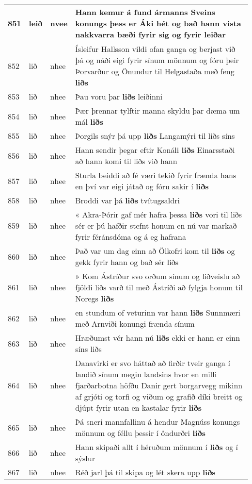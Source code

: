 \documentclass{article}
\begin{document}
\begin{longtable}{p{1cm}|p{1cm}|p{1cm}|p{13cm}}
\hline
851&leið&nvee&Hann kemur á fund ármanns Sveins konungs þess er Áki hét og bað hann vista nakkvarra bæði fyrir sig og fyrir \textbf{leiðar} \\
\hline
852&lið&nhee&Ísleifur Hallsson vildi ofan ganga og berjast við þá og náði eigi fyrir sínum mönnum og fóru þeir Þorvarður og Önundur til Helgastaða með feng \textbf{liðs} \\
\hline
853&lið&nhee&Þau voru þar \textbf{liðs} leiðinni\\
\hline
854&lið&nhee&Þær þrennar tylftir manna skyldu þar dæma um mál \textbf{liðs} \\
\hline
855&lið&nhee&Þorgils snýr þá upp \textbf{liðs} Langamýri til liðs síns\\
\hline
856&lið&nhee&Hann sendir þegar eftir Konáli \textbf{liðs} Einarsstaði að hann komi til liðs við hann\\
\hline
857&lið&nhee&Sturla beiddi að fé væri tekið fyrir frænda hans en því var eigi játað og fóru sakir í \textbf{liðs} \\
\hline
858&lið&nhee&Broddi var þá \textbf{liðs} tvítugsaldri\\
\hline
859&lið&nhee&« Akra-Þórir gaf mér hafra þessa \textbf{liðs} vori til liðs sér er þú hafðir stefnt honum en nú var markað fyrir féránsdóma og á eg hafrana\\
\hline
860&lið&nhee&Það var um dag einn að Ölkofri kom til \textbf{liðs} og gekk fyrir hann og bað sér liðs\\
\hline
861&lið&nhee&» Kom Ástríður svo orðum sínum og liðveislu að fjöldi liðs varð til með Ástríði að fylgja honum til Noregs \textbf{liðs} \\
\hline
862&lið&nhee&en stundum of veturinn var hann \textbf{liðs} Sunnmæri með Arnviði konungi frænda sínum\\
\hline
863&lið&nhee&Hræðumst vér hann nú \textbf{liðs} ekki er hann er einn síns liðs\\
\hline
864&lið&nhee&Danavirki er svo háttað að firðir tveir ganga í landið sínum megin landsins hvor en milli fjarðarbotna höfðu Danir gert borgarvegg mikinn af grjóti og torfi og viðum og grafið díki breitt og djúpt fyrir utan en kastalar fyrir \textbf{liðs} \\
\hline
865&lið&nhee&Þá sneri mannfallinu á hendur Magnúss konungs mönnum og féllu þessir í öndurðri \textbf{liðs} \\
\hline
866&lið&nhee&Hann skipaði allt í héruðum mönnum í \textbf{liðs} og í sýslur\\
\hline
867&lið&nhee&Réð jarl þá til skipa og lét skera upp \textbf{liðs} \\

\end{longtable}
\end{document}
